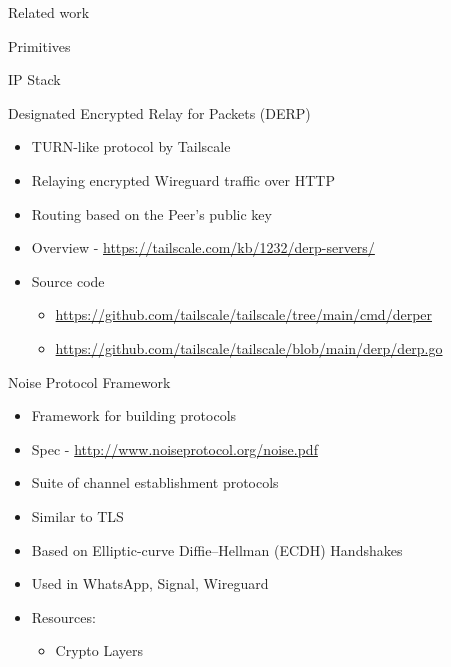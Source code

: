 \begin{frame}[fragile]{Related work}
\begin{block}{Primitives}
\begin{block}{IP Stack}
\begin{block}{Designated Encrypted Relay for Packets (DERP)}
\protect\hypertarget{designated-encrypted-relay-for-packets-derp}{}
\begin{itemize}
\tightlist
\item
  TURN-like protocol by Tailscale
\item
  Relaying encrypted Wireguard traffic over HTTP
\item
  Routing based on the Peer's public key
\item
  Overview - \url{https://tailscale.com/kb/1232/derp-servers/}
\item
  Source code

  \begin{itemize}
  \tightlist
  \item
    \url{https://github.com/tailscale/tailscale/tree/main/cmd/derper}
  \item
    \url{https://github.com/tailscale/tailscale/blob/main/derp/derp.go}
  \end{itemize}
\end{itemize}
\end{block}
\end{block}

\begin{block}{Noise Protocol Framework}
\protect\hypertarget{noise-protocol-framework}{}
\begin{itemize}
\tightlist
\item
  Framework for building protocols
\item
  Spec - \url{http://www.noiseprotocol.org/noise.pdf}
\item
  Suite of channel establishment protocols
\item
  Similar to TLS
\item
  Based on Elliptic-curve Diffie--Hellman (ECDH) Handshakes
\item
  Used in WhatsApp, Signal, Wireguard
\item
  Resources:

  \begin{itemize}
  \tightlist
  \item
    Crypto Layers


\end{itemize}
\end{itemize}
\end{block}
\end{block}
\end{frame}
